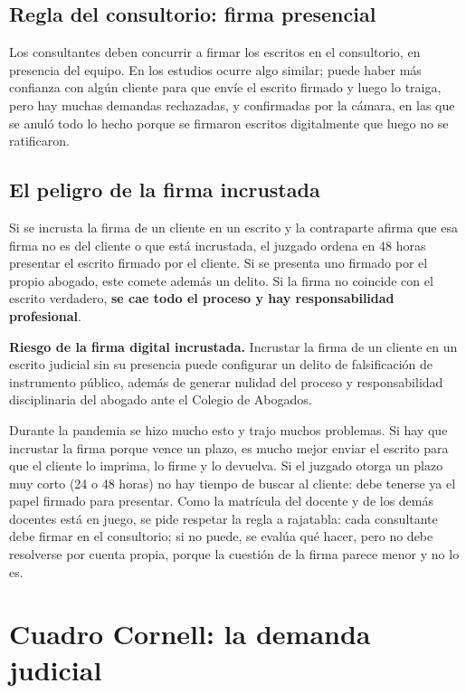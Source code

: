 \documentclass[12pt,oneside]{book}
\begin{document}
\subsection{Regla del consultorio: firma presencial}

Los consultantes deben concurrir a firmar los escritos en el consultorio, en presencia del equipo. En los estudios ocurre algo similar; puede haber más confianza con algún cliente para que envíe el escrito firmado y luego lo traiga, pero hay muchas demandas rechazadas, y confirmadas por la cámara, en las que se anuló todo lo hecho porque se firmaron escritos digitalmente que luego no se ratificaron.

\subsection{El peligro de la firma incrustada}

Si se incrusta la firma de un cliente en un escrito y la contraparte afirma que esa firma no es del cliente o que está incrustada, el juzgado ordena en 48 horas presentar el escrito firmado por el cliente. Si se presenta uno firmado por el propio abogado, este comete además un delito. Si la firma no coincide con el escrito verdadero, \textbf{se cae todo el proceso y hay responsabilidad profesional}.

\begin{important}
\textbf{Riesgo de la firma digital incrustada.} Incrustar la firma de un cliente en un escrito judicial sin su presencia puede configurar un delito de falsificación de instrumento público, además de generar nulidad del proceso y responsabilidad disciplinaria del abogado ante el Colegio de Abogados.
\end{important}

Durante la pandemia se hizo mucho esto y trajo muchos problemas. Si hay que incrustar la firma porque vence un plazo, es mucho mejor enviar el escrito para que el cliente lo imprima, lo firme y lo devuelva. Si el juzgado otorga un plazo muy corto (24 o 48 horas) no hay tiempo de buscar al cliente: debe tenerse ya el papel firmado para presentar. Como la matrícula del docente y de los demás docentes está en juego, se pide respetar la regla a rajatabla: cada consultante debe firmar en el consultorio; si no puede, se evalúa qué hacer, pero no debe resolverse por cuenta propia, porque la cuestión de la firma parece menor y no lo es.

\section{Cuadro Cornell: la demanda judicial}
\end{document}
